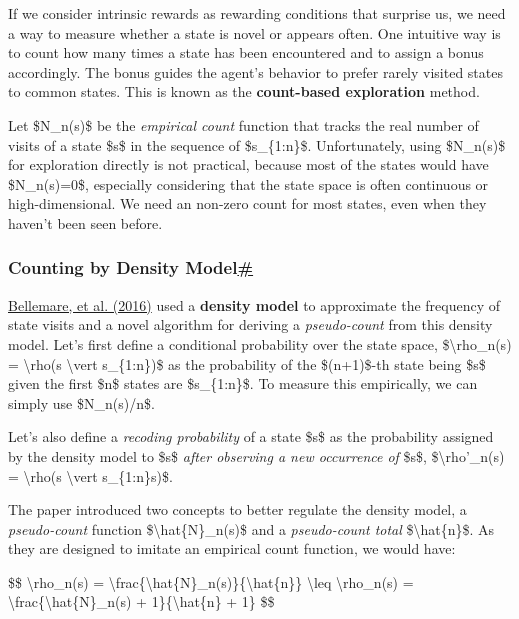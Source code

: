 If we consider intrinsic rewards as rewarding conditions that surprise us, we need a way to measure whether a state is novel or appears often. One intuitive way is to count how many times a state has been encountered and to assign a bonus accordingly. The bonus guides the agent's behavior to prefer rarely visited states to common states. This is known as the \textbf{count-based exploration} method.

Let \$N\_n(s)\$ be the \emph{empirical count} function that tracks the real number of visits of a state \$s\$ in the sequence of \$s\_\{1:n\}\$. Unfortunately, using \$N\_n(s)\$ for exploration directly is not practical, because most of the states would have \$N\_n(s)=0\$, especially considering that the state space is often continuous or high-dimensional. We need an non-zero count for most states, even when they haven't been seen before.

\subsubsection{\texorpdfstring{Counting by Density Model\hyperref[counting-by-density-model]{\#}}{Counting by Density Model\#}}\label{counting-by-density-model}

\href{https://arxiv.org/abs/1606.01868}{Bellemare, et al. (2016)} used a \textbf{density model} to approximate the frequency of state visits and a novel algorithm for deriving a \emph{pseudo-count} from this density model. Let's first define a conditional probability over the state space, \$\textbackslash rho\_n(s) = \textbackslash rho(s \textbackslash vert s\_\{1:n\})\$ as the probability of the \$(n+1)\$-th state being \$s\$ given the first \$n\$ states are \$s\_\{1:n\}\$. To measure this empirically, we can simply use \$N\_n(s)/n\$.

Let's also define a \emph{recoding probability} of a state \$s\$ as the probability assigned by the density model to \$s\$ \emph{after observing a new occurrence of} \$s\$, \$\textbackslash rho'\_n(s) = \textbackslash rho(s \textbackslash vert s\_\{1:n\}s)\$.

The paper introduced two concepts to better regulate the density model, a \emph{pseudo-count} function \$\textbackslash hat\{N\}\_n(s)\$ and a \emph{pseudo-count total} \$\textbackslash hat\{n\}\$. As they are designed to imitate an empirical count function, we would have:

\$\$ \textbackslash rho\_n(s) = \textbackslash frac\{\textbackslash hat\{N\}\_n(s)\}\{\textbackslash hat\{n\}\} \textbackslash leq \textbackslash rho\textquotesingle\_n(s) = \textbackslash frac\{\textbackslash hat\{N\}\_n(s) + 1\}\{\textbackslash hat\{n\} + 1\} \$\$

